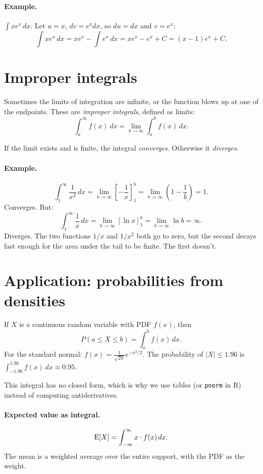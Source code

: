 \paragraph{Example.} $\int x e^x \, dx$. Let $u = x$, $dv = e^x dx$, so $du = dx$ and $v = e^x$:
\[
  \int x e^x \, dx = x e^x - \int e^x \, dx = x e^x - e^x + C = (x-1)e^x + C.
\]

\section{Improper integrals}

Sometimes the limits of integration are infinite, or the function blows up at one of the endpoints. These are \emph{improper integrals}, defined as limits:
\begin{equation}
  \int_a^{\infty} f(x)\,dx = \lim_{b \to \infty} \int_a^b f(x)\,dx.
\end{equation}

If the limit exists and is finite, the integral \emph{converges}. Otherwise it \emph{diverges}.

\paragraph{Example.}
\[
  \int_1^{\infty} \frac{1}{x^2}\,dx = \lim_{b \to \infty}\left[-\frac{1}{x}\right]_1^b = \lim_{b\to\infty}\left(1 - \frac{1}{b}\right) = 1.
\]
Converges. But:
\[
  \int_1^{\infty} \frac{1}{x}\,dx = \lim_{b\to\infty}[\ln x]_1^b = \lim_{b\to\infty} \ln b = \infty.
\]
Diverges. The two functions $1/x$ and $1/x^2$ both go to zero, but the second decays fast enough for the area under the tail to be finite. The first doesn't.

\section{Application: probabilities from densities}

If $X$ is a continuous random variable with PDF $f(x)$, then
\begin{equation}
  P(a \leq X \leq b) = \int_a^b f(x)\,dx.
\end{equation}
For the standard normal: $f(x) = \frac{1}{\sqrt{2\pi}}e^{-x^2/2}$. The probability of $|X| \leq 1.96$ is $\int_{-1.96}^{1.96} f(x)\,dx \approx 0.95$.

This integral has no closed form, which is why we use tables (or \texttt{pnorm} in R) instead of computing antiderivatives.

\paragraph{Expected value as integral.}
\begin{equation}
  \operatorname{E}[X] = \int_{-\infty}^{\infty} x \cdot f(x)\,dx.
\end{equation}
The mean is a weighted average over the entire support, with the PDF as the weight.

